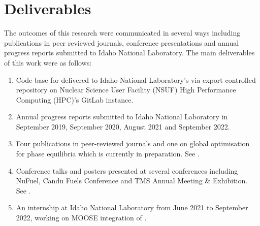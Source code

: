 \section{Deliverables}
	The outcomes of this research were communicated in several ways including publications in peer reviewed journals, conference presentations and annual progress reports submitted to Idaho National Laboratory. The main deliverables of this work were as follows:
	\begin{enumerate}
	\item Code base for {\GEM} delivered to Idaho National Laboratory's via export controlled repository on Nuclear Science User Facility (NSUF) High Performance Computing (HPC)'s GitLab instance.
	\item Annual progress reports submitted to Idaho National Laboratory in September 2019, September 2020, August 2021 and September 2022. 
	\item Four publications in peer-reviewed journals and one on global optimisation for phase equilibria which is currently in preparation. See .
	\item Conference talks and posters presented at several conferences including NuFuel, Candu Fuels Conference and TMS Annual Meeting \& Exhibition. See .
	\item An internship at Idaho National Laboratory from June 2021 to September 2022, working on MOOSE integration of \GEM.
	\end{enumerate}
	